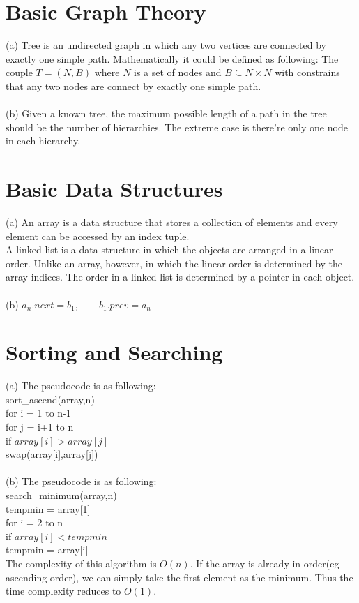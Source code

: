 \documentclass[11pt]{article}
\begin{document}
\section{Basic Graph Theory}
(a) Tree is an undirected graph in which any two vertices are connected by exactly one simple path. Mathematically it could be defined as following:
The couple $T=(N,B)$ where $N$ is a set of nodes and $B\subseteq N\times N$ with constrains that any two nodes are connect by exactly one simple path.\\
\\
(b) Given a known tree, the maximum possible length of a path in the tree should be the number of hierarchies. The extreme case is there're only one node in each hierarchy.

\section{Basic Data Structures}
(a) An array is a data structure that stores a collection of elements and every element can be accessed by an index tuple.\\
A linked list is a data structure in which the objects are arranged in a linear order. Unlike an array, however, in which the linear order is determined by the array indices. The order in a linked list is determined by a pointer in each object.\\
\\
(b) $a_n.next = b_1,\qquad b_1.prev = a_n$\\

\section{Sorting and Searching}
(a) The pseudocode is as following:\\
sort\_ascend(array,n)\\
for i = 1 to n-1\\
\indent for j = i+1 to n\\
\indent\indent if $array[i] > array[j]$\\
\indent\indent\indent swap(array[i],array[j])\\
\\
(b) The pseudocode is as following:\\
search\_minimum(array,n)\\
tempmin = array[1]\\
for i = 2 to n\\
\indent if $array[i]<tempmin$\\
\indent\indent tempmin = array[i]\\
The complexity of this algorithm is $O(n)$. If the array is already in order(eg ascending order), we can simply take the first element as the minimum. Thus the time complexity reduces to $O(1)$.
\end{document}
